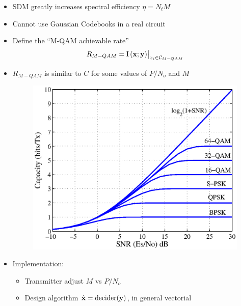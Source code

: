 \documentclass[xcolor=dvipsnames,aspectratio=169]{beamer}
\begin{document}
{\begin{figure}
    \end{figure}
    \begin{itemize}
     \item SDM greatly increases spectral efficiency $\eta=N_tM$
     \item Cannot use Gaussian Codebooks in a real circuit
     \pagebreak
     \item Define the ``M-QAM achievable rate''
        $$R_{M-QAM} =  {\textnormal{I}\left(\mathbf{x};\mathbf{y}\right)}\big|_{x_i\in\mathcal{C}_{M-QAM}}$$
     \item $R_{M-QAM}$ is similar to $C$ for some values of $P/N_o$ and $M$
        \begin{figure}
        \includegraphics[width=.35\columnwidth]{capacityDiCo}
        \end{figure}
     \item Implementation: 
     \begin{itemize}
        \item Transmitter adjust $M$ vs $P/N_o$
        \item Design algorithm $\hat{\mathbf{x}}=\textnormal{decider}(\mathbf{y})$, in general vectorial
    \end{itemize}
    \end{itemize}
}
\end{document}
